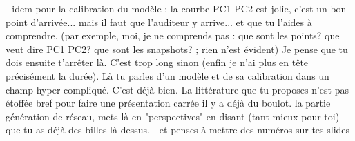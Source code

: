 \documentclass[11pt]{article}
\begin{document}
- idem pour la calibration du modèle : la courbe PC1 PC2 est jolie, c'est un bon point d'arrivée... mais il faut que l'auditeur y arrive... et que tu l'aides à comprendre. (par exemple, moi, je ne comprends pas : que sont les points? que veut dire PC1 PC2? que sont les snapshots? ; rien n'est évident)
Je pense que tu dois ensuite t'arrêter là. C'est trop long sinon (enfin je n'ai plus en tête précisément la durée). Là tu parles d'un modèle et de sa calibration dans un champ hyper compliqué. C'est déjà bien. La littérature que tu proposes n'est pas étoffée bref pour faire une présentation carrée il y a déjà du boulot. la partie génération de réseau, mets là en "perspectives" en disant (tant mieux pour toi) que tu as déjà des billes là dessus.
- et penses à mettre des numéros sur tes slides














%
\end{document}
